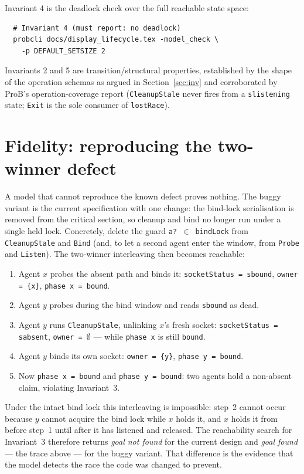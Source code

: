 \documentclass[a4paper,10pt,fleqn]{article}
\begin{document}
Invariant 4 is the deadlock check over the full reachable state space:
\begin{verbatim}
  # Invariant 4 (must report: no deadlock)
  probcli docs/display_lifecycle.tex -model_check \
    -p DEFAULT_SETSIZE 2
\end{verbatim}

Invariants 2 and 5 are transition/structural properties, established by
the shape of the operation schemas as argued in Section~\ref{sec:inv} and
corroborated by ProB's operation-coverage report (\texttt{CleanupStale}
never fires from a \texttt{slistening} state; \texttt{Exit} is the sole
consumer of \texttt{lostRace}).

\section{Fidelity: reproducing the two-winner defect}
\label{sec:fidelity}

A model that cannot reproduce the known defect proves nothing.  The
buggy variant is the current specification with one change: the bind-lock
serialisation is removed from the critical section, so cleanup and bind
no longer run under a single held lock.  Concretely, delete the guard
\texttt{a? $\in$ bindLock} from \texttt{CleanupStale} and \texttt{Bind}
(and, to let a second agent enter the window, from \texttt{Probe} and
\texttt{Listen}).  The two-winner interleaving then becomes reachable:

\begin{enumerate}
  \item Agent $x$ probes the absent path and binds it:
    \texttt{socketStatus = sbound}, \texttt{owner = \{x\}},
    \texttt{phase~x = bound}.
  \item Agent $y$ probes during the bind window and reads
    \texttt{sbound} as dead.
  \item Agent $y$ runs \texttt{CleanupStale}, unlinking $x$'s fresh
    socket: \texttt{socketStatus = sabsent}, \texttt{owner = $\emptyset$}
    --- while \texttt{phase~x} is still \texttt{bound}.
  \item Agent $y$ binds its own socket: \texttt{owner = \{y\}},
    \texttt{phase~y = bound}.
  \item Now \texttt{phase~x = bound} and \texttt{phase~y = bound}: two
    agents hold a non-absent claim, violating Invariant~3.
\end{enumerate}

Under the intact bind lock this interleaving is impossible: step~2
cannot occur because $y$ cannot acquire the bind lock while $x$ holds it,
and $x$ holds it from before step~1 until after it has listened and
released.  The reachability search for Invariant~3 therefore returns
\emph{goal not found} for the current design and \emph{goal found} --- the
trace above --- for the buggy variant.  That difference is the evidence
that the model detects the race the code was changed to prevent.
\end{document}
